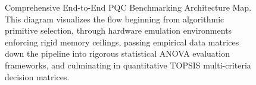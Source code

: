 \begin{figure}[htbp]
{\begin{tikzpicture}
\end{tikzpicture}
}
\caption{Comprehensive End-to-End PQC Benchmarking Architecture Map. This diagram visualizes the flow beginning from algorithmic primitive selection, through hardware emulation environments enforcing rigid memory ceilings, passing empirical data matrices down the pipeline into rigorous statistical ANOVA evaluation frameworks, and culminating in quantitative TOPSIS multi-criteria decision matrices.}
\label{fig:workflow_map}
\end{figure}
